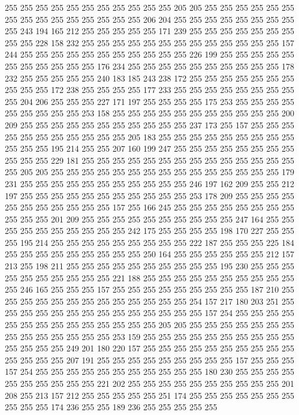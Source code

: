 255 255 255 255 255 255 255 255 255 255 255 205 205 255 255 255 255 255 255 255
255 255 255 255 255 255 255 255 206 204 255 255 255 255 255 255 255 255 255 243
194 165 212 255 255 255 255 255 171 239 255 255 255 255 255 255 255 255 255 228
158 232 255 255 255 255 255 255 255 255 255 255 255 255 255 157 244 255 255 255
255 255 255 255 255 255 255 255 226 199 255 255 255 255 255 255 255 255 255 255
255 176 234 255 255 255 255 255 255 255 255 255 255 178 232 255 255 255 255 255
240 183 185 243 238 172 255 255 255 255 255 255 255 255 255 255 172 238 255 255
255 255 177 233 255 255 255 255 255 255 255 255 255 204 206 255 255 255 227 171
197 255 255 255 255 175 253 255 255 255 255 255 255 255 255 255 253 158 255 255
255 255 255 255 255 255 255 255 255 200 209 255 255 255 255 255 255 255 255 255
255 255 237 173 255 157 255 255 255 255 255 255 255 255 255 255 255 205 183 255
255 255 255 255 255 255 255 255 255 255 255 195 214 255 255 207 160 199 247 255
255 255 255 255 255 255 255 255 255 255 229 181 255 255 255 255 255 255 255 255
255 255 255 255 255 255 255 205 205 255 255 255 255 255 255 255 255 255 255 255
255 255 255 255 179 231 255 255 255 255 255 255 255 255 255 255 255 246 197 162
209 255 255 212 197 255 255 255 255 255 255 255 255 255 255 255 253 178 209 255
255 255 255 255 255 255 255 255 255 255 157 255 166 245 255 255 255 255 255 255
255 255 255 255 255 201 209 255 255 255 255 255 255 255 255 255 255 247 164 255
255 255 255 255 255 255 255 255 255 242 175 255 255 255 255 198 170 227 255 255
255 195 214 255 255 255 255 255 255 255 255 255 222 187 255 255 255 225 184 255
255 255 255 255 255 255 255 255 250 164 255 255 255 255 255 255 212 157 213 255
198 211 255 255 255 255 255 255 255 255 255 255 195 230 255 255 255 255 255 255
255 255 255 255 221 188 255 255 255 255 255 255 255 255 255 255 255 246 165 255
255 255 157 255 255 255 255 255 255 255 255 255 187 210 255 255 255 255 255 255
255 255 255 255 255 255 255 254 157 217 180 203 251 255 255 255 255 255 255 255
255 255 255 255 255 255 255 157 254 255 255 255 255 255 255 255 255 255 255 255
255 255 255 205 205 255 255 255 255 255 255 255 255 255 255 255 255 255 255 253
159 255 255 255 255 255 255 255 255 255 255 255 255 255 255 249 201 180 220 157
255 255 255 255 255 255 255 255 255 255 255 255 255 255 207 191 255 255 255 255
255 255 255 255 255 157 255 255 255 157 254 255 255 255 255 255 255 255 255 255
255 255 180 230 255 255 255 255 255 255 255 255 255 255 221 202 255 255 255 255
255 255 255 255 255 255 201 208 255 213 157 212 255 255 255 255 255 251 174 255
255 255 255 255 255 255 255 255 255 174 236 255 255 189 236 255 255 255 255 255
